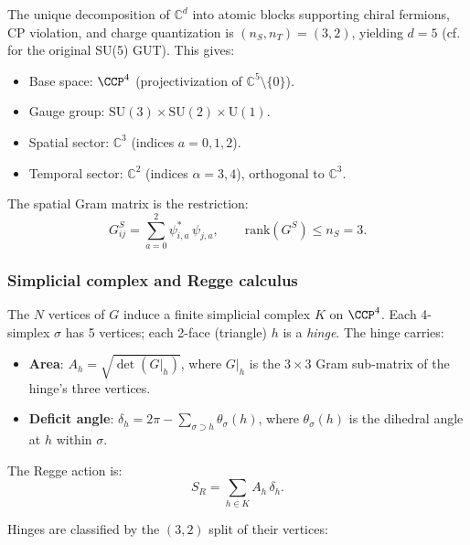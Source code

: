 \documentclass[12pt]{article}
\theoremstyle{remark}
\theoremstyle{definition}
\newcommand{\CC}{\mathbb{C}}
\begin{document}
The unique decomposition of $\CC^d$ into atomic blocks supporting
chiral fermions, CP violation, and charge quantization is
$(n_S, n_T) = (3, 2)$, yielding $d = 5$ 
(cf.\ \cite{GeorgiGlashow} for the original SU(5) GUT). This gives:

\begin{itemize}
\item Base space: $\CCP^4$ (projectivization of
  $\CC^5 \setminus \{0\}$).
\item Gauge group: $\mathrm{SU}(3) \times \mathrm{SU}(2) \times
  \mathrm{U}(1)$.
\item Spatial sector: $\CC^3$ (indices $a = 0, 1, 2$).
\item Temporal sector: $\CC^2$ (indices $\alpha = 3, 4$),
  orthogonal to $\CC^3$.
\end{itemize}

The spatial Gram matrix is the restriction:
\begin{equation}
G^S_{ij} = \sum_{a=0}^{2} \psi^*_{i,a}\, \psi_{j,a}, \qquad
\mathrm{rank}(G^S) \leq n_S = 3.
\label{eq:GS}
\end{equation}

\subsubsection{Simplicial complex and Regge calculus}

The $N$ vertices of $G$ induce a finite simplicial complex $K$ on
$\CCP^4$. Each 4-simplex $\sigma$ has 5 vertices; each 2-face
(triangle) $h$ is a \emph{hinge}. The hinge carries:

\begin{itemize}
\item \textbf{Area}: $A_h = \sqrt{\det(G|_h)}$, where $G|_h$ is the
  $3 \times 3$ Gram sub-matrix of the hinge's three vertices.
\item \textbf{Deficit angle}: $\delta_h = 2\pi -
  \sum_{\sigma \supset h} \theta_\sigma(h)$, where $\theta_\sigma(h)$
  is the dihedral angle at $h$ within $\sigma$.
\end{itemize}

\noindent
The Regge action \cite{Regge} is:
\begin{equation}
\boxed{S_R = \sum_{h \in K} A_h\, \delta_h.}
\label{eq:Regge_YM}
\end{equation}

Hinges are classified by the $(3,2)$ split of their vertices:
\end{document}
